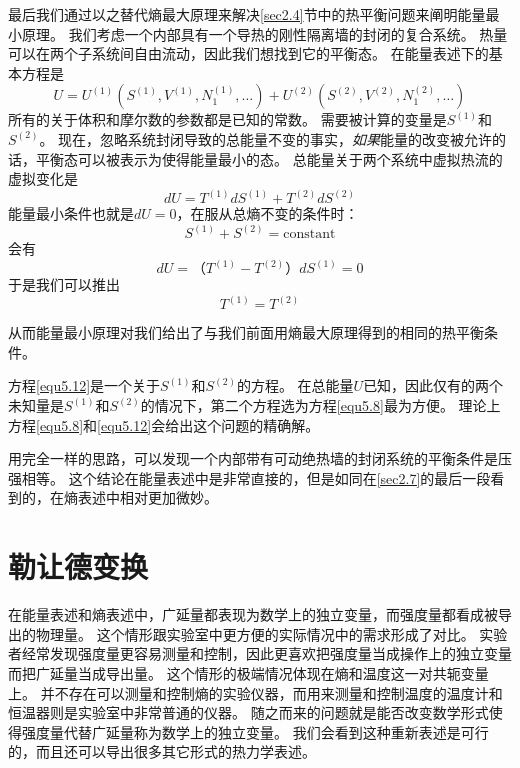 最后我们通过以之替代熵最大原理来解决\ref{sec2.4}节中的热平衡问题来阐明能量最小原理。
我们考虑一个内部具有一个导热的刚性隔离墙的封闭的复合系统。
热量可以在两个子系统间自由流动，因此我们想找到它的平衡态。
在能量表述下的基本方程是
\begin{equation}
\label{equ5.8}
U=U^{(1)}(S^{(1)},V^{(1)},N^{(1)}_1,\ldots)+U^{(2)}(S^{(2)},V^{(2)},N^{(2)}_1,\ldots)
\end{equation}
所有的关于体积和摩尔数的参数都是已知的常数。
需要被计算的变量是$S^{(1)}$和$S^{(2)}$。
现在，忽略系统封闭导致的总能量不变的事实，{\it 如果}能量的改变被允许的话，平衡态可以被表示为使得能量最小的态。
总能量关于两个系统中虚拟热流的虚拟变化是
\begin{equation}
\label{equ5.9}
dU=T^{(1)}dS^{(1)}+T^{(2)}dS^{(2)}
\end{equation}
能量最小条件也就是$dU=0$，在服从总熵不变的条件时：
\begin{equation}
\label{equ5.10}
S^{(1)}+S^{(2)}=\text{constant}
\end{equation}
会有
\begin{equation}
\label{equ5.11}
dU=（T^{(1)}-T^{(2)}）dS^{(1)}=0
\end{equation}
于是我们可以推出
\begin{equation}
\label{equ5.12}
T^{(1)}=T^{(2)}
\end{equation}

从而能量最小原理对我们给出了与我们前面用熵最大原理得到的相同的热平衡条件。

方程\eqref{equ5.12}是一个关于$S^{(1)}$和$S^{(2)}$的方程。
在总能量$U$已知，因此仅有的两个未知量是$S^{(1)}$和$S^{(2)}$的情况下，第二个方程选为方程\eqref{equ5.8}最为方便。
理论上方程\eqref{equ5.8}和\eqref{equ5.12}会给出这个问题的精确解。

用完全一样的思路，可以发现一个内部带有可动绝热墙的封闭系统的平衡条件是压强相等。
这个结论在能量表述中是非常直接的，但是如同在\ref{sec2.7}的最后一段看到的，在熵表述中相对更加微妙。

\section{勒让德变换}
\label{sec5.2}

在能量表述和熵表述中，广延量都表现为数学上的独立变量，而强度量都看成被导出的物理量。
这个情形跟实验室中更方便的实际情况中的需求形成了对比。
实验者经常发现强度量更容易测量和控制，因此更喜欢把强度量当成操作上的独立变量而把广延量当成导出量。
这个情形的极端情况体现在熵和温度这一对共轭变量上。
并不存在可以测量和控制熵的实验仪器，而用来测量和控制温度的温度计和恒温器则是实验室中非常普通的仪器。
随之而来的问题就是能否改变数学形式使得强度量代替广延量称为数学上的独立变量。
我们会看到这种重新表述是可行的，而且还可以导出很多其它形式的热力学表述。

